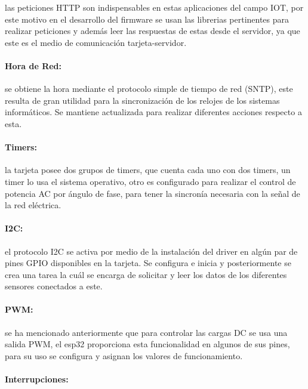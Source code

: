 las peticiones HTTP son indispensables en estas aplicaciones del campo IOT, por este motivo en el desarrollo del firmware se usan las librerias pertinentes para realizar peticiones y además leer las respuestas de estas desde el servidor, ya que este es el medio de comunicación tarjeta-servidor.

\paragraph{Hora de Red:}

se obtiene la hora mediante el protocolo simple de tiempo de red (SNTP), este resulta de gran utilidad para la sincronización de los relojes de los sistemas informáticos. Se mantiene actualizada para realizar diferentes acciones respecto a esta.

\paragraph{Timers:}

la tarjeta posee dos grupos de timers, que cuenta cada uno con dos timers, un timer lo usa el sistema operativo, otro es configurado para realizar el control de potencia AC por ángulo de fase, para tener la sincronía necesaria con la señal de la red eléctrica.

\paragraph{I2C:}

el protocolo I2C se activa por medio de la instalación del driver en algún par de pines GPIO disponibles en la tarjeta. Se configura e inicia y posteriormente se crea una tarea la cuál se encarga de solicitar y leer los datos de los diferentes sensores conectados a este.

\paragraph{PWM:}

se ha mencionado anteriormente que para controlar las cargas DC se usa una salida PWM, el esp32 proporciona esta funcionalidad en algunos de sus pines, para su uso se configura y asignan los valores de funcionamiento.

\paragraph{Interrupciones:}

